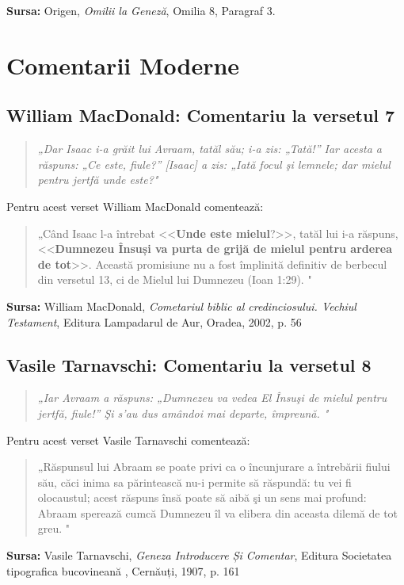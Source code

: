 \documentclass[12pt,a4paper]{article}
\begin{document}
\vspace{0.5cm}
\noindent\textbf{Sursa:} Origen, \emph{Omilii la Geneză}, Omilia 8, Paragraf 3.

\section{Comentarii Moderne}
\subsection{William MacDonald: Comentariu la versetul 7}

\begin{quote}
    \textit{„Dar Isaac i-a grăit lui Avraam, tatăl său; i-a zis: „Tată!” Iar acesta a
    răspuns: „Ce este, fiule?” [Isaac] a zis:
    „Iată focul şi lemnele; dar mielul pentru jertfă unde este?"}
\end{quote}

Pentru acest verset William MacDonald comentează:
\begin{quote}
    „Când Isaac l-a întrebat <<\textbf{Unde este mielul}?>>, tatăl lui i-a
    răspuns, <<\textbf{Dumnezeu Însuși va purta de grijă de mielul pentru arderea de tot}>>. Această promisiune nu a fost împlinită definitiv de berbecul din versetul 13, ci de Mielul lui Dumnezeu (Ioan 1:29).
    "
\end{quote}

\vspace{0.5cm}
\noindent\textbf{Sursa:} William MacDonald, \emph{Cometariul biblic al credinciosului. Vechiul Testament}, Editura Lampadarul de Aur, Oradea, 2002, p. 56

\subsection{Vasile Tarnavschi: Comentariu la versetul 8}

\begin{quote}
    \textit{„Iar Avraam a răspuns: „Dumnezeu
        va vedea El Însuşi de mielul pentru
        jertfă, fiule!” Şi s’au dus amândoi mai
        departe, împreună.
        "}
\end{quote}

Pentru acest verset Vasile Tarnavschi comentează:
\begin{quote}
    „Răspunsul lui Abraam se poate privi ca o încunjurare a întrebării fiului său, căci inima sa părintească nu-i permite să răspundă: tu vei fi olocaustul;
    acest răspuns însă poate să aibă şi un sens mai profund: Abraam sperează
    cumcă Dumnezeu îl va elibera din aceasta dilemă de tot greu.
    "
\end{quote}

\vspace{0.5cm}
\noindent\textbf{Sursa:} Vasile Tarnavschi, \emph{Geneza
    Introducere Și Comentar}, Editura Societatea tipografica bucovineană
, Cernăuți, 1907, p. 161
\end{document}
